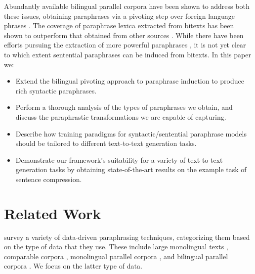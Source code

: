 \documentclass[11pt]{article}
\begin{document}
Abundantly available bilingual parallel corpora have been shown to
address both these issues, obtaining paraphrases via a pivoting step
over foreign language phrases \cite{Callison-Burch2005}. The coverage
of paraphrase lexica extracted from bitexts has been shown to
outperform that obtained from other sources \cite{Zhao2008b}. While
there have been efforts pursuing the extraction of more powerful
paraphrases
\cite{Madnani2007,Callison-Burch2008,cohn-lapata:2008,Zhao2008}, it is
not yet clear to which extent sentential paraphrases can be induced
from bitexts. In this paper we:
\begin{itemize}
\item Extend the bilingual pivoting approach to paraphrase induction
  to produce rich syntactic paraphrases.
\item Perform a thorough analysis of the types of paraphrases we
  obtain, and discuss the paraphrastic transformations we are capable
  of capturing.
\item Describe how training paradigms for
  syntactic/sentential paraphrase models should be tailored to
  different text-to-text generation tasks.
\item Demonstrate our framework's suitability for a variety of
  text-to-text generation tasks by obtaining state-of-the-art results on the example task of sentence
  compression.
\end{itemize}


\section{Related Work} \label{related_work}

 survey a variety of data-driven paraphrasing
techniques, categorizing them based on the type of data that they use.
These include large monolingual texts
\cite{Lin2001,szpektor-EtAl:2004:EMNLP,Bhagat2008}, comparable corpora
\cite{Barzilay2003,Dolan2004}, monolingual parallel corpora
\cite{Barzilay2001,Pang2003}, and bilingual parallel corpora
\cite{Callison-Burch2005,Madnani2007,Zhao2008}.  We focus on the
latter type of data.
\end{document}
